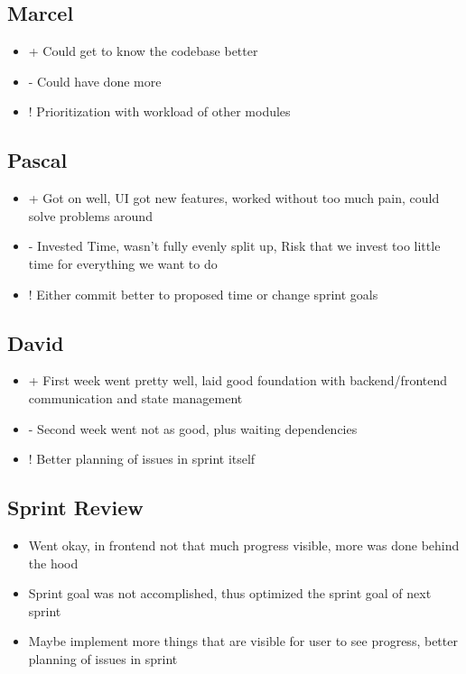 \subsection{Marcel}
\begin{itemize}
    \item + Could get to know the codebase better
    \item - Could have done more
    \item ! Prioritization with workload of other modules
\end{itemize}

\subsection{Pascal}
\begin{itemize}
    \item + Got on well, UI got new features, worked without too much pain, could solve problems around
    \item - Invested Time, wasn't fully evenly split up, Risk that we invest too little time for everything we want to do
    \item ! Either commit better to proposed time or change sprint goals
\end{itemize}

\subsection{David}
\begin{itemize}
    \item + First week went pretty well, laid good foundation with backend/frontend communication and state management
    \item - Second week went not as good, plus waiting dependencies
    \item ! Better planning of issues in sprint itself
\end{itemize}

\subsection{Sprint Review}
\begin{itemize}
    \item Went okay, in frontend not that much progress visible, more was done behind the hood
    \item Sprint goal was not accomplished, thus optimized the sprint goal of next sprint
    \item Maybe implement more things that are visible for user to see progress, better planning of issues in sprint
\end{itemize}


